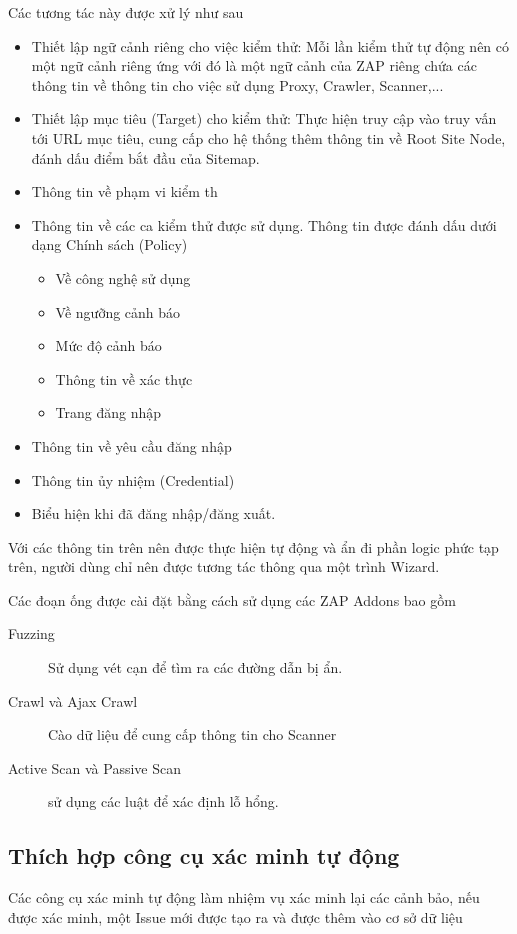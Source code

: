 \documentclass[./../main.tex]{subfiles}
\begin{document}
Các tương tác này được xử lý như sau
\begin{itemize}
	\item Thiết lập ngữ cảnh riêng cho việc kiểm thử: Mỗi lần kiểm thử tự động nên có một ngữ cảnh riêng ứng với đó là một ngữ cảnh của ZAP riêng chứa các thông tin về thông tin cho việc sử dụng Proxy, Crawler, Scanner,...
	\item Thiết lập mục tiêu (Target) cho kiểm thử: Thực hiện truy cập vào truy vấn tới URL mục tiêu, cung cấp cho hệ thống thêm thông tin về Root Site Node, đánh dấu điểm bắt đầu của Sitemap.
	\item Thông tin về phạm vi kiểm th
	\item Thông tin về các ca kiểm thử được sử dụng. Thông tin được đánh dấu dưới dạng Chính sách (Policy)
	      \begin{itemize}
		      \item Về công nghệ sử dụng
		      \item Về ngưỡng cảnh báo
		      \item Mức độ cảnh báo
		      \item Thông tin về xác thực
		      \item Trang đăng nhập
	      \end{itemize}
	\item Thông tin về yêu cầu đăng nhập
	\item Thông tin ủy nhiệm (Credential)
	\item Biểu hiện khi đã đăng nhập/đăng xuất.

\end{itemize}
Với các thông tin trên nên được thực hiện tự động và ẩn đi phần logic phức tạp trên, người dùng chỉ nên được tương tác thông qua một trình Wizard.

Các đoạn ống được cài đặt bằng cách sử dụng các ZAP Addons bao gồm
\begin{description}
	\item[Fuzzing] Sử dụng vét cạn để tìm ra các đường dẫn bị ẩn.
	\item[Crawl và Ajax Crawl] Cào dữ liệu để cung cấp thông tin cho Scanner
	\item[Active Scan và Passive Scan] sử dụng các luật để xác định lỗ hổng.
\end{description}

\subsection{Thích hợp công cụ xác minh tự động}
Các công cụ xác minh tự động làm nhiệm vụ xác minh lại các cảnh bảo, nếu được xác minh, một Issue mới được tạo ra và được thêm vào cơ sở dữ liệu
\end{document}
